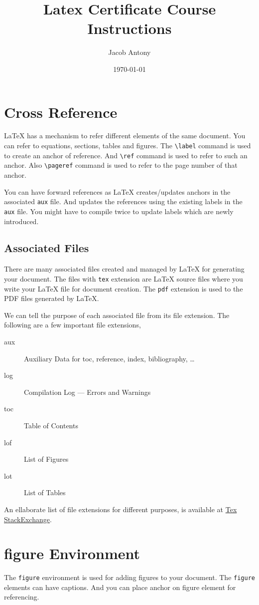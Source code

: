 \documentclass{article}
\title{Latex Certificate Course Instructions}
\author{Jacob Antony}
\date{\today}
\theoremstyle{definition}
\theoremstyle{remark}
\begin{document}
\maketitle

\section{Cross Reference}
	\LaTeX{} has a mechanism to refer different elements of the same document. You can refer to equations, sections, tables and figures. The \texttt{\textbackslash label} command is used to create an anchor of reference. And \texttt{\textbackslash ref} command is used to refer to such an anchor. Also \texttt{\textbackslash pageref} command is used to refer to the page number of that anchor.
	
	You can have forward references as \LaTeX{} creates/updates anchors in the associated \texttt{aux} file. And updates the references using the existing labels in the \texttt{aux} file. You might have to compile twice to update labels which are newly introduced.

\subsection{Associated Files}
	There are many associated files created and managed by \LaTeX{} for generating your document. The files with \texttt{tex} extension are \LaTeX{} source files where you write your \LaTeX{} file for document creation. The \texttt{pdf} extension is used to the PDF files generated by \LaTeX{}. 

	We can tell the purpose of each associated file from its file extension. The following are a few important file extensions,
\begin{description}
	\item[aux] Auxiliary Data for toc, reference, index, bibliography, \dots
	\item[log] Compilation Log --- Errors and Warnings
	\item[toc] Table of Contents
	\item[lof] List of Figures
	\item[lot] List of Tables
\end{description}

An ellaborate list of file extensions for different purposes, is available at \href{https://tex.stackexchange.com/questions/7770/file-extensions-related-to-latex-etc}{Tex StackExchange}.

\section{figure Environment}
	The \texttt{figure} environment is used for adding figures to your document. The \texttt{figure} elements can have captions. And you can place anchor on figure element for referencing.
\end{document}
